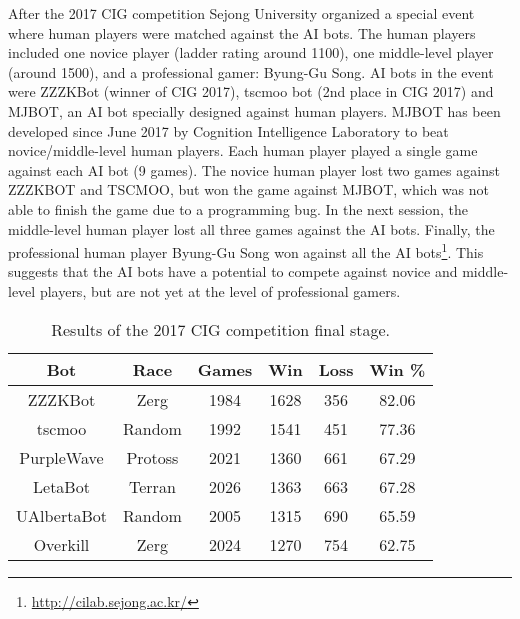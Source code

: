 After the 2017 CIG competition Sejong University organized a special event where human players were matched against the AI bots. The human players included one novice player (ladder rating around 1100), one middle-level player (around 1500), and a professional gamer: Byung-Gu Song. AI bots in the event were ZZZKBot (winner of CIG 2017), tscmoo bot (2nd place in CIG 2017) and MJBOT, an AI bot specially designed against human players. MJBOT has been developed since June 2017 by Cognition Intelligence Laboratory to beat novice/middle-level human players. Each human player played a single game against each AI bot (9 games). The novice human player lost two games against ZZZKBOT and TSCMOO, but won the game against MJBOT, which was not able to finish the game due to a programming bug. In the next session, the middle-level human player lost all three games against the AI bots. Finally, the professional human player Byung-Gu Song won against all the AI bots\footnote{\url{http://cilab.sejong.ac.kr/}}. This suggests that the AI bots have a potential to compete against novice and middle-level players, but are not yet at the level of professional gamers. 

\begin{table}[t]
\begin{center}
	\begin{tabular}{| c | c | c | c | c | c |}
		\hline
		\textbf{Bot} & \textbf{Race} & \textbf{Games} & \textbf{Win} & \textbf{Loss} & \textbf{Win \%} \\
		\hline
		ZZZKBot & Zerg & 1984 & 1628 & 356 & 82.06 \\
		\hline
		tscmoo & Random & 1992 & 1541 & 451 & 77.36 \\
		\hline
		PurpleWave & Protoss & 2021 & 1360 & 661 & 67.29 \\
		\hline
		LetaBot & Terran & 2026 & 1363 & 663 & 67.28 \\
		\hline
		UAlbertaBot & Random & 2005 & 1315 & 690 & 65.59 \\
		\hline
		Overkill & Zerg & 2024 & 1270 & 754 & 62.75 \\
		\hline
 \end{tabular}
 \end{center}  
 \caption{Results of the 2017 CIG competition final stage.}
 \label{tableCIG}
\end{table}

